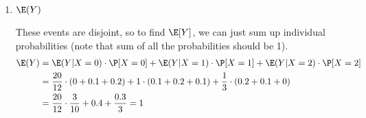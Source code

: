 \begin{enumerate}[label=(\alph*)]
\item $\E(Y)$
\begin{solution}[1cm]
These events are disjoint, so to find  $\E[Y]$, we can just sum up 
individual probabilities (note that sum of all the probabilities should be 1). 
\begin{equation}
\begin{split}
\E(Y) &= \E(Y|X=0) \cdot \P[X=0] + \E(Y|X=1) \cdot \P[X=1] + \E(Y|X=2) 
\cdot \P[X=2] \\ \nonumber
         &= \frac{20}{12} \cdot (0 + 0.1 + 0.2) + 1 \cdot (0.1 + 0.2 + 0.1) 
         + \frac{1}{3} \cdot (0.2 + 0.1 + 0) \\
         &= \frac{20}{12} \cdot \frac{3}{10} + 0.4 + \frac{0.3}{3} = 1
\end{split}
\end{equation}
\end{solution}
\end{enumerate}